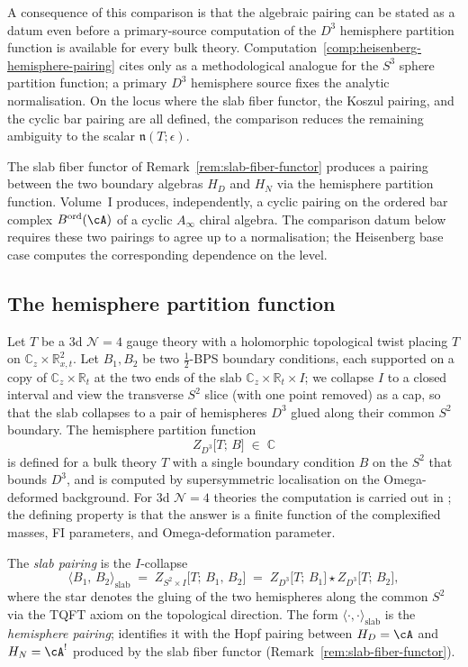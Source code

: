 A consequence of this comparison is that the algebraic pairing
can be stated as a datum even before a primary-source computation
of the $D^3$ hemisphere partition function is available for every
bulk theory. Computation~\ref{comp:heisenberg-hemisphere-pairing}
cites \cite{DFPY16} only as a methodological analogue for the $S^3$
sphere partition function; a primary $D^3$ hemisphere source fixes
the analytic normalisation. On the locus where the slab
fiber functor, the Koszul pairing, and the cyclic bar pairing are all
defined, the comparison reduces the remaining ambiguity to the scalar
$\mathfrak n(T;\epsilon)$.

The slab fiber functor of
Remark~\ref{rem:slab-fiber-functor} produces a pairing between
the two boundary algebras $H_D$ and $H_N$ via the hemisphere
partition function. Volume~I produces, independently, a cyclic
pairing on the ordered bar complex $B^{\mathrm{ord}}(\cA)$ of a
cyclic $A_\infty$ chiral algebra. The comparison datum below
requires these two pairings to agree up to a normalisation; the
Heisenberg base case computes the corresponding dependence on the
level.

\subsection{The hemisphere partition function}
\label{subsec:hemisphere-partition-function}

Let $T$ be a $3$d $\mathcal N=4$ gauge theory with a holomorphic
topological twist placing $T$ on
$\mathbb C_z \times \mathbb R^2_{x,t}$. Let $B_1, B_2$ be two
$\tfrac12$-BPS boundary conditions, each supported on a copy of
$\mathbb C_z \times \mathbb R_t$ at the two ends of the slab
$\mathbb C_z \times \mathbb R_t \times I$; we collapse $I$ to a
closed interval and view the transverse $S^2$ slice (with one
point removed) as a cap, so that the slab collapses to a pair of
hemispheres $D^3$ glued along their common $S^2$ boundary. The
hemisphere partition function
\[
 Z_{D^3}\bigl[T;\, B\bigr]
 \;\in\; \mathbb C
\]
is defined for a bulk theory $T$ with a single boundary
condition $B$ on the $S^2$ that bounds $D^3$, and is computed by
supersymmetric localisation on the Omega-deformed background.
For $3$d $\mathcal N=4$ theories the computation is carried out
in \cite{DFPY16}; the defining property is that the answer is a
finite function of the complexified masses, FI parameters, and
Omega-deformation parameter.

The \emph{slab pairing} is the $I$-collapse
\[
 \bigl\langle B_1,\, B_2\bigr\rangle_{\mathrm{slab}}
 \;=\;
 Z_{S^2\times I}\bigl[T;\, B_1,\, B_2\bigr]
 \;=\;
 Z_{D^3}\bigl[T;\, B_1\bigr]\star
 Z_{D^3}\bigl[T;\, B_2\bigr],
\]
where the star denotes the gluing of the two hemispheres
along the common $S^2$ via the TQFT axiom on the topological
direction. The form $\langle\cdot,\cdot\rangle_{\mathrm{slab}}$ is the
\emph{hemisphere pairing}; \cite{Dimofte25} identifies it
with the Hopf pairing between $H_D = \cA$ and $H_N = \cA^!$
produced by the slab fiber functor
(Remark~\ref{rem:slab-fiber-functor}).

